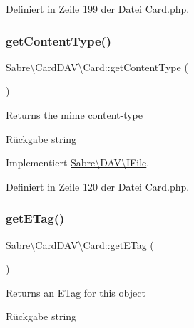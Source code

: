 Definiert in Zeile 199 der Datei Card.\+php.

\mbox{\label{class_sabre_1_1_card_d_a_v_1_1_card_a236500a390730115bf035c20ff78b3d9}} 
\subsubsection{\texorpdfstring{get\+Content\+Type()}{getContentType()}}
{\footnotesize\ttfamily Sabre\textbackslash{}\+Card\+D\+A\+V\textbackslash{}\+Card\+::get\+Content\+Type (\begin{DoxyParamCaption}{ }\end{DoxyParamCaption})}

Returns the mime content-\/type

\begin{DoxyReturn}{Rückgabe}
string 
\end{DoxyReturn}


Implementiert \mbox{\hyperlink{interface_sabre_1_1_d_a_v_1_1_i_file_aa76147e3e0ad228026dcb03035b499bc}{Sabre\textbackslash{}\+D\+A\+V\textbackslash{}\+I\+File}}.



Definiert in Zeile 120 der Datei Card.\+php.

\mbox{\label{class_sabre_1_1_card_d_a_v_1_1_card_a056407dada85e2786c53b6a26ead94e7}} 
\subsubsection{\texorpdfstring{get\+E\+Tag()}{getETag()}}
{\footnotesize\ttfamily Sabre\textbackslash{}\+Card\+D\+A\+V\textbackslash{}\+Card\+::get\+E\+Tag (\begin{DoxyParamCaption}{ }\end{DoxyParamCaption})}

Returns an E\+Tag for this object

\begin{DoxyReturn}{Rückgabe}
string 
\end{DoxyReturn}


